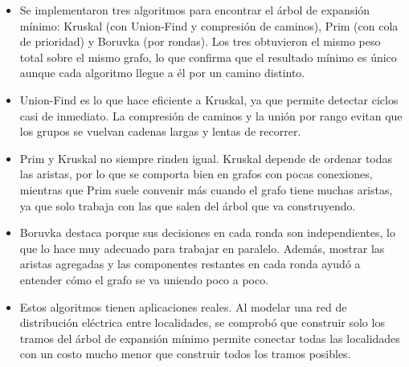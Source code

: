 \documentclass{article}
\begin{document}
\begin{itemize}
	\item Se implementaron tres algoritmos para encontrar el árbol de expansión mínimo: Kruskal (con Union-Find y compresión de caminos), Prim (con cola de prioridad) y Boruvka (por rondas). Los tres obtuvieron el mismo peso total sobre el mismo grafo, lo que confirma que el resultado mínimo es único aunque cada algoritmo llegue a él por un camino distinto.

	\item Union-Find es lo que hace eficiente a Kruskal, ya que permite detectar ciclos casi de inmediato. La compresión de caminos y la unión por rango evitan que los grupos se vuelvan cadenas largas y lentas de recorrer.

	\item Prim y Kruskal no siempre rinden igual. Kruskal depende de ordenar todas las aristas, por lo que se comporta bien en grafos con pocas conexiones, mientras que Prim suele convenir más cuando el grafo tiene muchas aristas, ya que solo trabaja con las que salen del árbol que va construyendo.

	\item Boruvka destaca porque sus decisiones en cada ronda son independientes, lo que lo hace muy adecuado para trabajar en paralelo. Además, mostrar las aristas agregadas y las componentes restantes en cada ronda ayudó a entender cómo el grafo se va uniendo poco a poco.

	\item Estos algoritmos tienen aplicaciones reales. Al modelar una red de distribución eléctrica entre localidades, se comprobó que construir solo los tramos del árbol de expansión mínimo permite conectar todas las localidades con un costo mucho menor que construir todos los tramos posibles.

\end{itemize}

    
%
%
%
			
\end{document}
